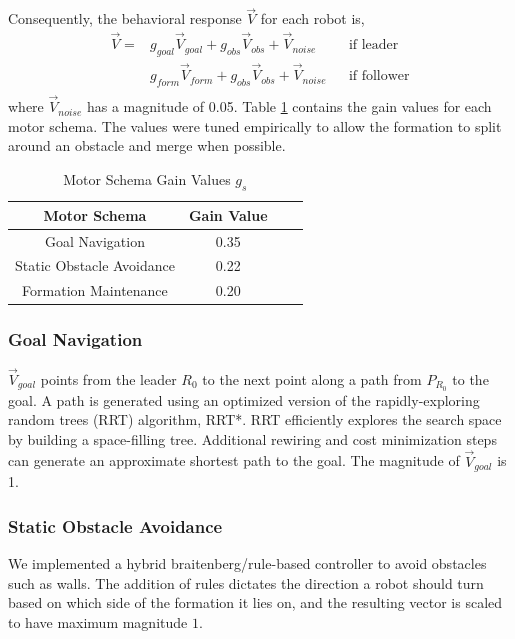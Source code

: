 \documentclass[letterpaper, 10 pt, conference]{ieeeconf}  %
\begin{document}
Consequently, the behavioral response $\vec{V}$ for each robot is,
\begin{equation*}
\begin{aligned}
\vec{V} = & g_{goal} \vec{V}_{goal} + g_{obs} \vec{V}_{obs} + \vec{V}_{noise}    && \text{if leader} \\
              & g_{form} \vec{V}_{form} + g_{obs} \vec{V}_{obs} + \vec{V}_{noise}   && \text{if follower} \\
\end{aligned}
\end{equation*}
where $\vec{V}_{noise}$ has a magnitude of 0.05. Table \ref{motor_schema_gs} contains the gain values for each motor schema. The values were tuned empirically to allow the formation to split around an obstacle and merge when possible.

\begin{table}[h]
\begin{center}
\begin{tabular}{|c|c|c c|}
\hline
Motor Schema & Gain Value \\
\hline
Goal Navigation                  & 0.35 \\
Static Obstacle Avoidance    & 0.22 \\
Formation Maintenance       & 0.20 \\
\hline
\end{tabular}
\end{center}
\caption{Motor Schema Gain Values $g_s$}
\label{motor_schema_gs}
\end{table}

\subsubsection*{Goal Navigation}

$\vec{V}_{goal}$ points from the leader $R_0$ to the next point along a path from $P_{R_0}$ to the goal. A path is generated using an optimized version of the rapidly-exploring random trees (RRT) algorithm, RRT*. RRT efficiently explores the search space by building a space-filling tree. Additional rewiring and cost minimization steps can generate an approximate shortest path to the goal. The magnitude of $\vec{V}_{goal}$ is 1.

\subsubsection*{Static Obstacle Avoidance}

We implemented a hybrid braitenberg/rule-based controller to avoid obstacles such as walls. The addition of rules dictates the direction a robot should turn based on which side of the formation it lies on, and the resulting vector is scaled to have maximum magnitude $1$.
\end{document}
